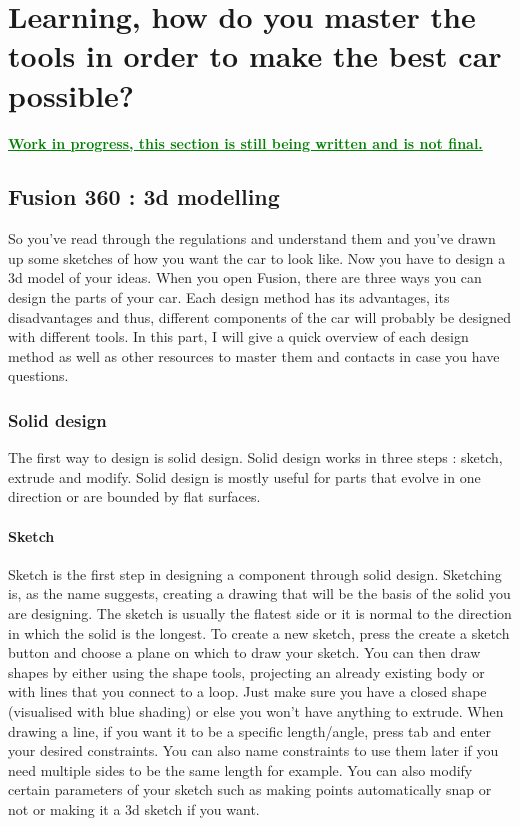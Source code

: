\chapter{Learning, how do you master the tools in order to make the best car possible?}

\textcolor{green}{\underline{\textbf{Work in progress, this section is still being written and is not final.}}}

\section{Fusion 360 : 3d modelling}

So you’ve read through the regulations and understand them and you’ve drawn up some sketches of how you want the car to look like. Now you have to design a 3d model of your ideas. When you open Fusion, there are three ways you can design the parts of your car. Each design method has its advantages, its disadvantages and thus, different components of the car will probably be designed with different tools. In this part, I will give a quick overview of each design method as well as other resources to master them and contacts in case you have questions.

\subsection{Solid design}
The first way to design is solid design. Solid design works in three steps : sketch, extrude and modify. Solid design is mostly useful for parts that evolve in one direction or are bounded by flat surfaces. 

\subsubsection{Sketch}
Sketch is the first step in designing a component through solid design. Sketching is, as the name suggests, creating a drawing that will be the basis of the solid you are designing. The sketch is usually the flatest side or it is normal to the direction in which the solid is the longest. To create a new sketch, press the create a sketch button and choose a plane on which to draw your sketch. You can then draw shapes by either using the shape tools, projecting an already existing body or with lines that you connect to a loop. Just make sure you have a closed shape (visualised with blue shading) or else you won’t have anything to extrude. When drawing a line, if you want it to be a specific length/angle, press tab and enter your desired constraints. You can also name constraints to use them later if you need multiple sides to be the same length for example. You can also modify certain parameters of your sketch such as making points automatically snap or not or making it a 3d sketch if you want.

